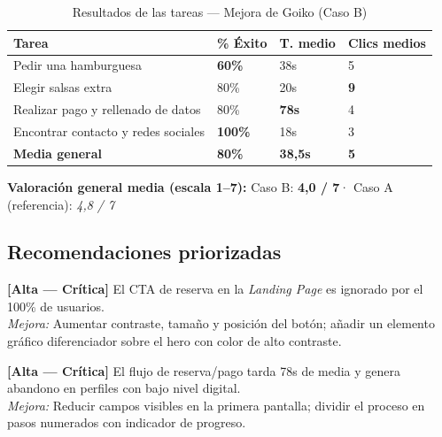 \documentclass[11pt,a4paper]{article}
\begin{document}
\begin{table}[H]
\centering
\caption{Resultados de las tareas — Mejora de Goiko (Caso B)}
\begin{tabularx}{\textwidth}{@{} X C{2cm} C{2.5cm} C{2.5cm} @{}}
\toprule
{}
\color{white}\textbf{Tarea}               &
\color{white}\textbf{\% Éxito}            &
\color{white}\textbf{T. medio}            &
\color{white}\textbf{Clics medios}        \\
\midrule
Pedir una hamburguesa               &
  \textcolor{dangerred}{\textbf{60\%}} & 38s & 5 \\
Elegir salsas extra                 &
  80\% & 20s & \textcolor{warnamber}{\textbf{9}} \\
Realizar pago y rellenado de datos  &
  80\% & \textcolor{dangerred}{\textbf{78s}} & 4 \\
Encontrar contacto y redes sociales &
  \textcolor{okgreen}{\textbf{100\%}} & 18s & 3 \\
\midrule
{}
\color{white}\textbf{Media general} &
\color{white}\textbf{80\%}          &
\color{white}\textbf{38,5s}         &
\color{white}\textbf{5}             \\
\bottomrule
\end{tabularx}
\end{table}

\begin{infobox}
\textbf{Valoración general media (escala 1–7):}\enspace
Caso B: \textbf{4,0 / 7}\enspace·\enspace
Caso A (referencia): \textit{4,8 / 7}
\end{infobox}

\subsection{Recomendaciones priorizadas}

\noindent\textbf{[Alta — Crítica]}\enspace
El CTA de reserva en la \textit{Landing Page} es ignorado por el 100\% de usuarios.\\
\textit{Mejora:} Aumentar contraste, tamaño y posición del botón; añadir un elemento
gráfico diferenciador sobre el hero con color de alto contraste.

\medskip
\noindent\textbf{[Alta — Crítica]}\enspace
El flujo de reserva/pago tarda 78s de media y genera abandono en perfiles con bajo nivel digital.\\
\textit{Mejora:} Reducir campos visibles en la primera pantalla; dividir el proceso en pasos
numerados con indicador de progreso.
\end{document}
